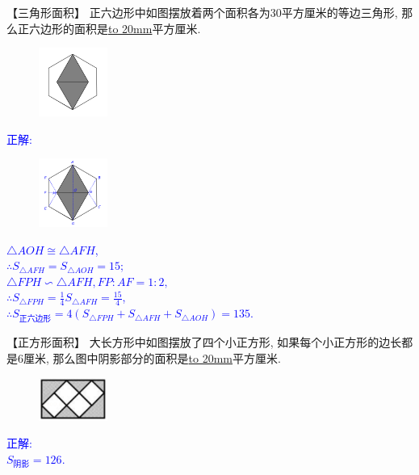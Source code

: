 \item {
    【三角形面积】
    正六边形中如图摆放着两个面积各为30平方厘米的等边三角形, 那么正六边形的面积是\underline{\hbox to 20mm{}}平方厘米.
    \begin{figure}[H] 
        \centering
        \includegraphics[width=0.2\textwidth]{./pics/Chapter_2/18.png}
    \end{figure}
    \ifshowSolution 
        \fangsong{}\textcolor{blue}{
            正解: \\
            \begin{figure}[H] 
                \centering
                \includegraphics[width=0.2\textwidth]{./pics/Chapter_2/seikai_18.png}
            \end{figure}
            $\triangle AOH \cong \triangle AFH$, \\
            $\therefore S_{\triangle AFH} = S_{\triangle AOH}= 15;$  \\
            $\triangle FPH \backsim \triangle AFH, FP:AF=1:2,$ \\
            $\therefore S_{\triangle FPH} = \frac14 S_{\triangle AFH} = \frac{15}{4}$,\\
            $\therefore S_{正六边形} = 4(S_{\triangle FPH} + S_{\triangle AFH} + S_{\triangle AOH}) = 135$.
        }
    \else
        \vspace{1cm}
    \fi
}

\item {
    【正方形面积】
    大长方形中如图摆放了四个小正方形, 如果每个小正方形的边长都是6厘米, 那么图中阴影部分的面积是\underline{\hbox to 20mm{}}平方厘米.
    \begin{figure}[H] 
        \centering
        \includegraphics[width=0.2\textwidth]{./pics/Chapter_2/19.png}
    \end{figure}
    \ifshowSolution 
        \fangsong{}\textcolor{blue}{
            正解: \\
            $S_{阴影} = 126$.
        }
    \else
        \vspace{1cm}
    \fi
}

